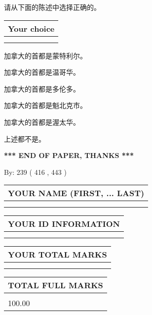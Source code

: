 \documentclass{ctexart}
\begin{document}
  
请从下面的陈述中选择正确的。
  
  
\noindent\hspace{3.0in} \begin{tabular}{|l|}
\hline
Your choice \\
\hline
 \\ 
 \\ 
\hline
\end{tabular}
  
  
 
 
加拿大的首都是蒙特利尔。
 
 
加拿大的首都是温哥华。
 
 
加拿大的首都是多伦多。
 
 
加拿大的首都是魁北克市。
 
 
加拿大的首都是渥太华。
 
 
 上述都不是。
 
 
   
   
 \vspace{0.2in}
 
   
   
   
   
\vspace{1.0in} 
{\textbf{\large{ *** END OF PAPER, THANKS *** }}} 
   
   
\hspace{1.0in} By: 
 239 ( 416 ,  443 )
   
   
   
   
\newpage 
\setcounter{page}{ 
   424001 } 
   
   
   
   
\noindent\begin{tabular}{|l|}
\hline
YOUR NAME (FIRST, ... LAST)  \\
\hline
 \\ 
 \\ 
\hline
\end{tabular}
\hspace{0.05in} \begin{tabular}{|l|}
\hline
 YOUR   ID   INFORMATION  \\
\hline
 \\ 
 \\ 
\hline
\end{tabular}
   
   
\vspace{0.2in}\noindent\begin{tabular}{|l|}
\hline
YOUR TOTAL MARKS  \\
\hline
 \\ 
 \\ 
\hline
\end{tabular}
\hspace{0.05in} \begin{tabular}{|l|}
\hline
TOTAL FULL MARKS  \\
\hline
 \\ 
100.00 \\
\hline
\end{tabular}
   
\end{document}
